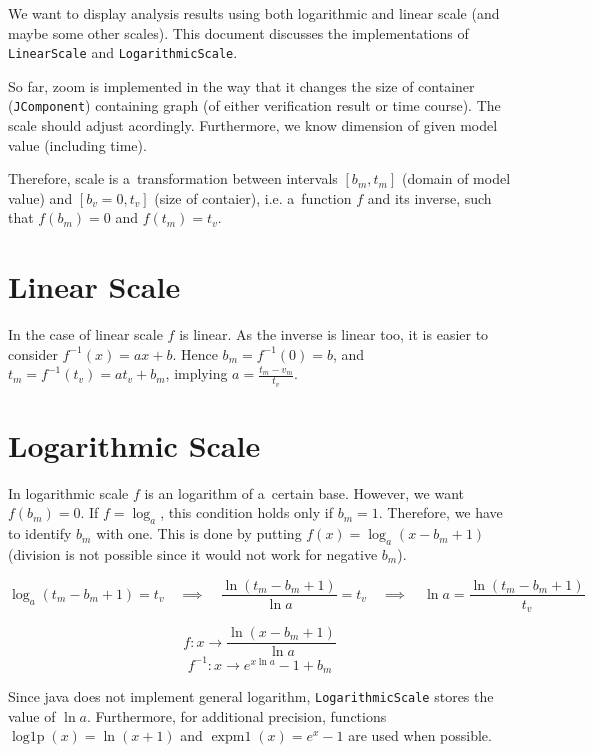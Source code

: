 \documentclass{article}
\begin{document}
We want to display analysis results using both logarithmic and linear scale (and maybe some other scales).
This document discusses the implementations of \texttt{LinearScale} and \texttt{LogarithmicScale}.

So far, zoom is implemented in the way that it changes the size of container (\texttt{JComponent}) containing
graph (of either verification result or time course). The scale should adjust acordingly. Furthermore,
we know dimension of given model value (including time).

Therefore, scale is a~transformation between intervals $[b_m,t_m]$ (domain of model value) and $[b_v=0,t_v]$ (size of contaier),
i.e. a~function $f$ and its inverse, such that $f(b_m)=0$ and $f(t_m)=t_v$.

\section{Linear Scale}
In the case of linear scale $f$ is linear. As the inverse is linear too, it is easier to consider $f^{-1}(x)=ax+b$.
Hence $b_m=f^{-1}(0)=b$, and $t_m=f^{-1}(t_v)=at_v+b_m$, implying $a=\frac{t_m-v_m}{t_v}$.

\section{Logarithmic Scale}
In logarithmic scale $f$ is an logarithm of a~certain base. However, we want $f(b_m)=0$. If $f=\log_a$, this condition holds
only if $b_m=1$. Therefore, we have to identify $b_m$ with one. This is done by putting $f(x)=\log_a(x-b_m+1)$ (division is not
possible since it would not work for negative $b_m$).

$$\log_a(t_m-b_m+1)=t_v \quad\implies\quad \frac{\ln (t_m-b_m+1)}{\ln a}=t_v \quad\implies\quad \ln a=\frac{\ln(t_m-b_m+1)}{t_v}$$

$$f:x\to\frac{\ln(x-b_m+1)}{\ln a}$$
$$f^{-1}:x\to e^{x\ln a}-1+b_m$$

Since java does not implement general logarithm, \texttt{LogarithmicScale} stores the value of $\ln a$. Furthermore, for additional precision,
functions $\operatorname{log1p}(x)=\ln(x+1)$ and $\operatorname{expm1}(x)=e^x-1$ are used when possible.
\end{document}
